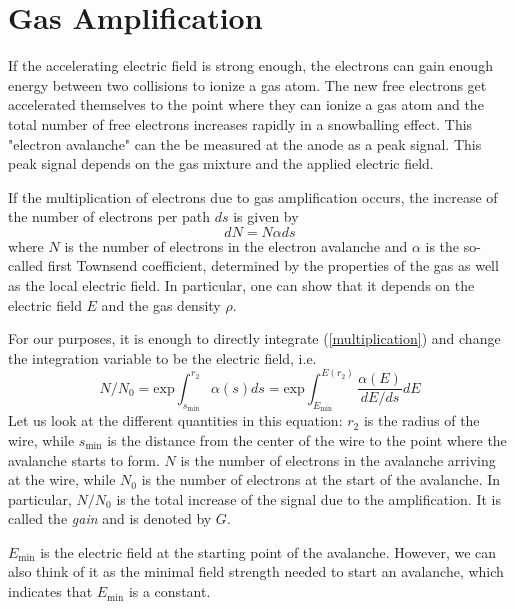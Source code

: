 \documentclass[12pt]{article}
\begin{document}
\section{Gas Amplification}

If the accelerating electric field is strong enough, the electrons can gain enough energy between two collisions to ionize a gas atom. The new free electrons get accelerated themselves to the point where they can ionize a gas atom and the total number of free electrons increases rapidly in a snowballing effect. This "electron avalanche" can the be measured at the anode as a peak signal. This peak signal depends on the gas mixture and the applied electric field.

If the multiplication of electrons due to gas amplification occurs, the increase of the number of electrons per path $ds$ is given by
\begin{equation}
	dN = N\alpha ds
\label{multiplication}
\end{equation}
where $N$ is the number of electrons in the electron avalanche and $\alpha$ is the so-called first Townsend coefficient, determined by the properties of the gas as well as the local electric field. In particular, one can show that it depends on the electric field $E$ and the gas density $\rho$.
	
For our purposes, it is enough to directly integrate (\ref{multiplication}) and change the integration variable to be the electric field, i.e.
\begin{equation}
	N/N_0 = \text{exp} \int^{r_2}_{s_{\min}}\alpha(s)ds = \text{exp} \int^{E(r_2)}_{E_{\min}} \frac{\alpha(E)}{dE/ds}dE
    \label{basic_integral}
\end{equation}
Let us look at the different quantities in this equation: $r_2$ is the radius of the wire, while $s_{\text{min}}$ is the distance from the center of the wire to the point where the avalanche starts to form. $N$ is the number of electrons in the avalanche arriving at the wire, while $N_0$ is the number of electrons at the start of the avalanche. In particular, $N/N_0$ is the total increase of the signal due to the amplification. It is called the \emph{gain} and is denoted by $G$.
	
$E_{\text{min}}$ is the electric field at the starting point of the avalanche. However, we can also think of it as the minimal field strength needed to start an avalanche, which indicates that $E_{\text{min}}$ is a constant.
	
\end{document}

